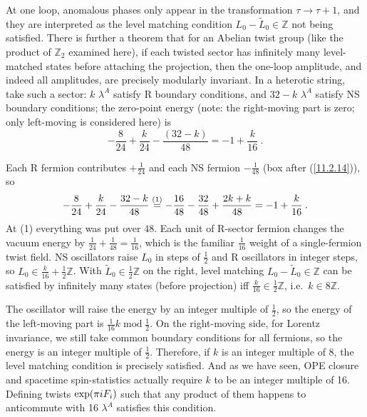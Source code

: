 At one loop, anomalous phases only appear in the transformation $\tau\to\tau+1$, and they are interpreted as the level matching condition $L_{0}-\tilde{L}_{0}\in\mathds{Z}$ not being satisfied. There is further a theorem that for an Abelian twist group (like the product of $\mathds{Z}_{2}$ examined here), if each twisted sector has infinitely many level-matched states before attaching the projection, then the one-loop amplitude, and indeed all amplitudes, are precisely modularly invariant. In a heterotic string, take such a sector: $k$ $\lambda^{A}$ satisfy R boundary conditions, and $32-k$ $\lambda^{A}$ satisfy NS boundary conditions; the zero-point energy (note: the right-moving part is zero; only left-moving is considered here) is
\begin{equation}
	{-}\frac{8}{24}+\frac{k}{24}-\frac{(32-k)}{48}=-1+\frac{k}{16} \:. \label{11.3.6}
\end{equation}
\begin{tcolorbox}[breakable]
	\begin{remark}
		Each R fermion contributes $+\frac{1}{24}$ and each NS fermion $-\frac{1}{48}$ (box after (\ref{11.2.14})), so
		\begin{equation*}
			-\frac{8}{24}+\frac{k}{24}-\frac{32-k}{48}\overset{(1)}{=}-\frac{16}{48}-\frac{32}{48}+\frac{2k+k}{48}=-1+\frac{k}{16}\:.
		\end{equation*}
		At (1) everything was put over $48$. Each unit of R-sector fermion changes the vacuum energy by $\frac{1}{24}+\frac{1}{48}=\frac{1}{16}$, which is the familiar $\frac{1}{16}$ weight of a single-fermion twist field. NS oscillators raise $L_{0}$ in steps of $\frac{1}{2}$ and R oscillators in integer steps, so $L_{0}\in\frac{k}{16}+\frac{1}{2}\mathds{Z}$. With $\tilde{L}_{0}\in\frac{1}{2}\mathds{Z}$ on the right, level matching $L_{0}-\tilde{L}_{0}\in\mathds{Z}$ can be satisfied by infinitely many states (before projection) iff $\frac{k}{16}\in\frac{1}{2}\mathds{Z}$, i.e.\ $k\in8\mathds{Z}$.
	\end{remark}
\end{tcolorbox}
The oscillator will raise the energy by an integer multiple of $\frac{1}{2}$, so the energy of the left-moving part is $\frac{1}{16}k\operatorname{mod}\frac{1}{2}$. On the right-moving side, for Lorentz invariance, we still take common boundary conditions for all fermions, so the energy is an integer multiple of $\frac{1}{2}$. Therefore, if $k$ is an integer multiple of 8, the level matching condition is precisely satisfied. And as we have seen, OPE closure and spacetime spin-statistics actually require $k$ to be an integer multiple of 16. Defining twists $\exp(\pi i F_{i})$ such that any product of them happens to anticommute with 16 $\lambda^{A}$ satisfies this condition.


